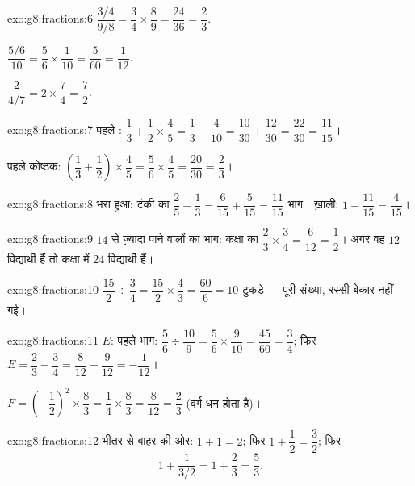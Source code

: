 \begin{solution}{exo:g8:fractions:6}
$\dfrac{3/4}{9/8} = \dfrac34 \times \dfrac89 = \dfrac{24}{36} =
\dfrac23$.

$\dfrac{5/6}{10} = \dfrac56 \times \dfrac{1}{10} = \dfrac{5}{60} =
\dfrac{1}{12}$.

$\dfrac{2}{4/7} = 2 \times \dfrac74 = \dfrac72$.
\end{solution}

\begin{solution}{exo:g8:fractions:7}
पहले :
$\dfrac13 + \dfrac12 \times \dfrac45 = \dfrac13 + \dfrac{4}{10}
= \dfrac{10}{30} + \dfrac{12}{30} = \dfrac{22}{30} = \dfrac{11}{15}$।

पहले कोष्ठक:
$\left(\dfrac13 + \dfrac12\right) \times \dfrac45
= \dfrac56 \times \dfrac45 = \dfrac{20}{30} = \dfrac23$।
\end{solution}

\begin{solution}{exo:g8:fractions:8}
भरा हुआ: टंकी का $\dfrac25 + \dfrac13 = \dfrac{6}{15} +
\dfrac{5}{15} = \dfrac{11}{15}$ भाग। ख़ाली:
$1 - \dfrac{11}{15} = \dfrac{4}{15}$।
\end{solution}

\begin{solution}{exo:g8:fractions:9}
$14$ से ज़्यादा पाने वालों का भाग:
कक्षा का $\dfrac23 \times \dfrac34 = \dfrac{6}{12} = \dfrac12$।
अगर वह $12$ विद्यार्थी हैं तो कक्षा में $24$ विद्यार्थी हैं।
\end{solution}

\begin{solution}{exo:g8:fractions:10}
$\dfrac{15}{2} \div \dfrac34 = \dfrac{15}{2} \times \dfrac43
= \dfrac{60}{6} = 10$ टुकड़े --- पूरी संख्या, रस्सी बेकार नहीं गई।
\end{solution}

\begin{solution}{exo:g8:fractions:11}
$E$: पहले भाग:
$\dfrac56 \div \dfrac{10}{9} = \dfrac56 \times \dfrac{9}{10}
= \dfrac{45}{60} = \dfrac34$; फिर
$E = \dfrac23 - \dfrac34 = \dfrac{8}{12} - \dfrac{9}{12} =
-\dfrac{1}{12}$।

$F = \left(-\dfrac12\right)^2 \times \dfrac83 = \dfrac14 \times
\dfrac83 = \dfrac{8}{12} = \dfrac23$ (वर्ग धन होता है)।
\end{solution}

\begin{solution}{exo:g8:fractions:12}
भीतर से बाहर की ओर: $1 + 1 = 2$; फिर
$1 + \dfrac12 = \dfrac32$; फिर
\[
1 + \frac{1}{3/2} = 1 + \frac23 = \frac53 .
\]
\end{solution}

